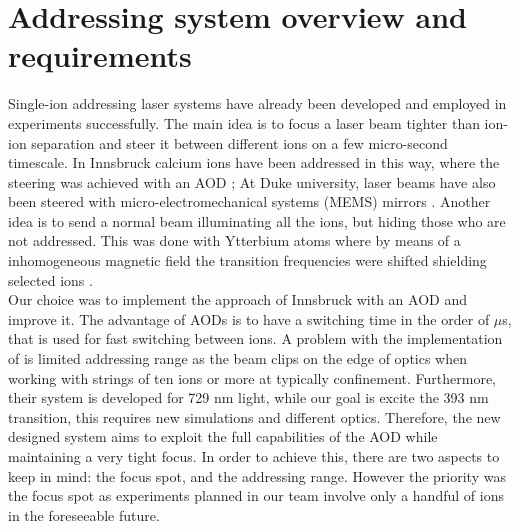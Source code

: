 \section{Addressing system overview and requirements}
\label{sec:addressing}
Single-ion addressing laser systems have already been developed and employed in experiments successfully. The main idea is to focus a laser beam tighter than ion-ion separation and steer it between different ions on a few micro-second timescale. In Innsbruck calcium ions have been addressed in this way, where the steering was achieved with an AOD \cite{addressing}; At Duke university, laser beams have also been steered with micro-electromechanical systems (MEMS) mirrors \cite{addressing3}. Another idea is to send a normal beam illuminating all the ions, but hiding those who are not addressed. This was done with Ytterbium atoms where by means of a inhomogeneous magnetic field the transition frequencies were shifted shielding selected ions \cite{addressing2}. \\
Our choice was to implement the approach of Innsbruck with an AOD and improve it. The advantage of AODs is to have a switching time in the order of $\mu$s, that is used for fast switching between ions. A problem with the implementation of \cite{addressing} is limited addressing range as the beam clips on the edge of optics when working with strings of ten ions or more at typically confinement. Furthermore, their system is developed for 729 nm light, while our goal is excite the 393 nm transition, this requires new simulations and different optics. Therefore, the new designed system aims to exploit the full capabilities of the AOD while maintaining a very tight focus. In order to achieve this, there are two aspects to keep in mind: the focus spot, and the addressing range. However the priority was the focus spot as experiments planned in our team involve only a handful of ions in the foreseeable future.
